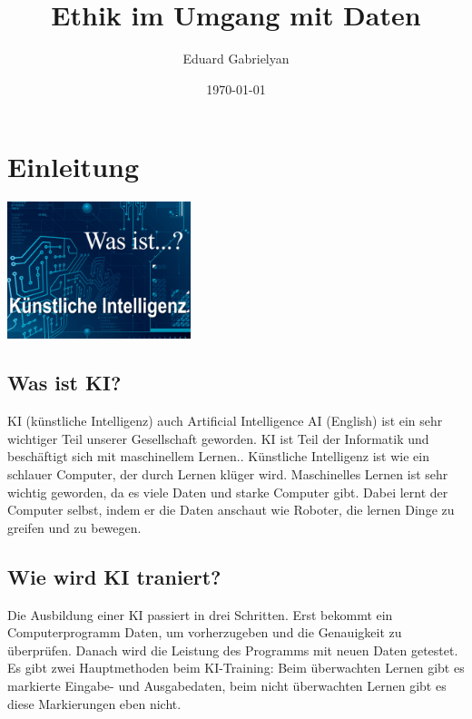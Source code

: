 \documentclass{report}
\title{Ethik im Umgang mit Daten}
\author{Eduard Gabrielyan}
\date{\today}
\begin{document}
\maketitle


\tableofcontents

\chapter{Einleitung}

\includegraphics[width=0.4\textwidth]{KI.jpeg} 

\section{Was ist KI?}
KI (künstliche Intelligenz) auch Artificial Intelligence AI (English) ist ein sehr wichtiger Teil unserer Gesellschaft geworden.
KI ist Teil der Informatik und beschäftigt sich mit maschinellem Lernen.\citep{ai-wikipedia}.
\newline
Künstliche Intelligenz ist wie ein schlauer Computer, der durch Lernen klüger wird. Maschinelles Lernen ist sehr wichtig geworden, da es viele Daten und starke Computer gibt. Dabei lernt der Computer selbst, indem er die Daten anschaut wie Roboter, die lernen Dinge zu greifen und zu bewegen. \citep{ai-fh}
\section{Wie wird KI traniert?}
Die Ausbildung einer KI passiert in drei Schritten. Erst bekommt ein Computerprogramm Daten, um vorherzugeben und die Genauigkeit zu überprüfen. Danach wird die Leistung des Programms mit neuen Daten getestet. Es gibt zwei Hauptmethoden beim KI-Training: Beim überwachten Lernen gibt es markierte Eingabe- und Ausgabedaten, beim nicht überwachten Lernen gibt es diese Markierungen eben nicht.
\citep{ai-training-cw}
\end{document}
